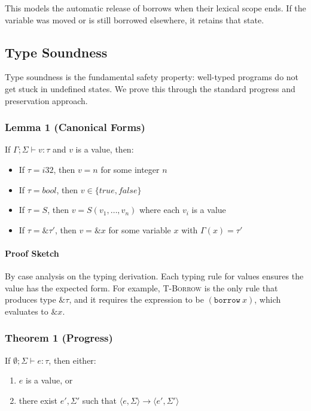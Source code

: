 \documentclass[11pt,a4paper,twoside]{book}
\begin{document}
This models the automatic release of borrows when their lexical scope ends.
If the variable was moved or is still borrowed elsewhere, it retains that state.


\subsection{Type Soundness}

Type soundness is the fundamental safety property: well-typed programs do not
get stuck in undefined states. We prove this through the standard progress and
preservation approach.

\subsubsection{Lemma 1 (Canonical Forms)}

If $\Gamma ; \Sigma \vdash v : \tau$ and $v$ is a value, then:

\begin{itemize}
  \item If $\tau = i32$, then $v = n$ for some integer $n$
  \item If $\tau = bool$, then $v \in \{true, false\}$
  \item If $\tau = S$, then $v = S(v_1,\dots,v_n)$ where each $v_i$ is a value
  \item If $\tau = \&\tau'$, then $v = \&x$ for some variable $x$ with $\Gamma(x) = \tau'$
\end{itemize}

\paragraph{Proof Sketch}
By case analysis on the typing derivation. Each typing rule for values ensures
the value has the expected form. For example, \textsc{T-Borrow} is the only rule
that produces type $\&\tau$, and it requires the expression to be
$(\mathtt{borrow}\ x)$, which evaluates to $\&x$.


\subsubsection{Theorem 1 (Progress)}

If $\emptyset ; \Sigma \vdash e : \tau$, then either:
\begin{enumerate}
  \item $e$ is a value, or
  \item there exist $e', \Sigma'$ such that
    $\langle e, \Sigma \rangle \rightarrow \langle e', \Sigma' \rangle$
\end{enumerate}
\end{document}
